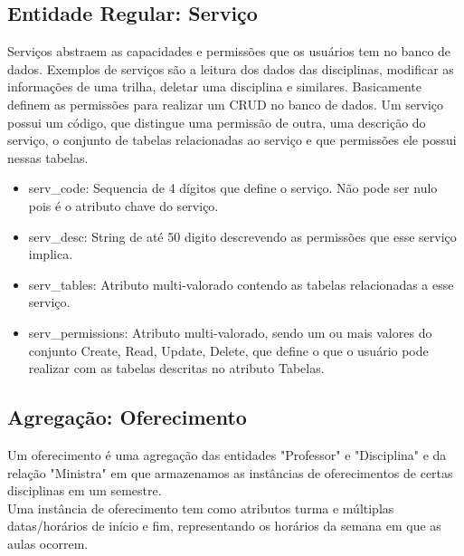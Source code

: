 \documentclass{article}
\begin{document}
  	\subsection{Entidade Regular: Serviço}
  	    \quad Serviços abstraem as capacidades e permissões que os usuários tem no banco de dados. Exemplos de serviços são a leitura dos dados das disciplinas, modificar as informações de uma trilha, deletar uma disciplina e similares. Basicamente definem as permissões para realizar um CRUD no banco de dados.
  	    \quad Um serviço possui um código, que distingue uma permissão de outra, uma descrição do serviço, o conjunto de tabelas relacionadas ao serviço e que permissões ele possui nessas tabelas.
  	    \begin{itemize}
  	        \item serv\_code: Sequencia de 4 dígitos que define o serviço. Não pode ser nulo pois é o atributo chave do serviço.
  	        \item serv\_desc: String de até 50 digito descrevendo as permissões que esse serviço implica.
  	        \item serv\_tables: Atributo multi-valorado contendo as tabelas relacionadas a esse serviço.
  	        \item serv\_permissions: Atributo multi-valorado, sendo um ou mais valores do conjunto {Create, Read, Update, Delete}, que define o que o usuário pode realizar com as tabelas descritas no atributo Tabelas.
  	    \end{itemize}
  		    
  	\subsection{Agregação: Oferecimento}
  	    \quad Um oferecimento é uma agregação das entidades "Professor" e "Disciplina" e da relação "Ministra" em que armazenamos as instâncias de oferecimentos de certas disciplinas em um semestre. \\
  	    \quad Uma instância de oferecimento tem como atributos turma e múltiplas datas/horários de início e fim, representando os horários da semana em que as aulas ocorrem. 
\end{document}
